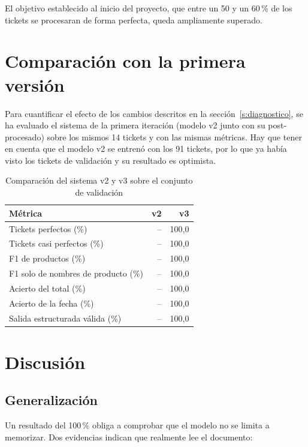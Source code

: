 El objetivo establecido al inicio del proyecto, que entre un 50 y un 60\,\% de los tickets se procesaran de forma perfecta, queda ampliamente superado.

\section{Comparación con la primera versión}
\label{s:comparacion}
Para cuantificar el efecto de los cambios descritos en la sección~\ref{s:diagnostico}, se ha evaluado el sistema de la primera iteración (modelo v2 junto con su post-procesado) sobre los mismos 14 tickets y con las mismas métricas. Hay que tener en cuenta que el modelo v2 se entrenó con los 91 tickets, por lo que ya había visto los tickets de validación y su resultado es optimista.

\begin{table}[htbp]
    \caption{\label{tab:comparacion}Comparación del sistema v2 y v3 sobre el conjunto de validación}
    \begin{tabularx}{\textwidth}{@{}Xrr@{}}
        \toprule
        \textbf{Métrica} & \textbf{v2} & \textbf{v3} \\
        \midrule
        Tickets perfectos (\%) & -- & 100,0 \\
        Tickets casi perfectos (\%) & -- & 100,0 \\
        F1 de productos (\%) & -- & 100,0 \\
        F1 solo de nombres de producto (\%) & -- & 100,0 \\
        Acierto del total (\%) & -- & 100,0 \\
        Acierto de la fecha (\%) & -- & 100,0 \\
        Salida estructurada válida (\%) & -- & 100,0 \\
        \bottomrule
    \end{tabularx}
\end{table}

\section{Discusión}
\subsection{Generalización}
Un resultado del 100\,\% obliga a comprobar que el modelo no se limita a memorizar. Dos evidencias indican que realmente lee el documento:

